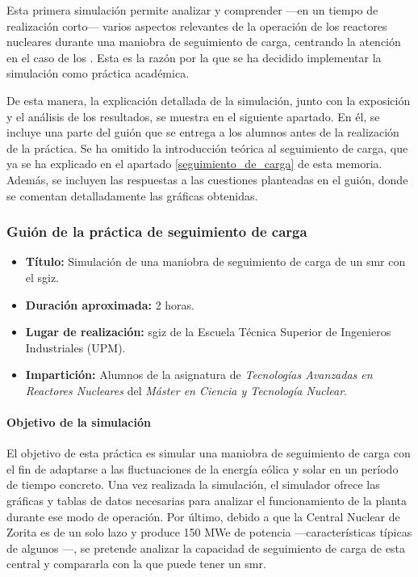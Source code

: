 Esta primera simulación permite analizar y comprender ---en un tiempo de realización corto--- varios aspectos relevantes de la operación de los reactores nucleares durante una maniobra de seguimiento de carga, centrando la atención en el caso de los . Esta es la razón por la que se ha decidido implementar la simulación como práctica académica.

De esta manera, la explicación detallada de la simulación, junto con la exposición y el análisis de los resultados, se muestra en el siguiente apartado. En él, se incluye una parte del guión que se entrega a los alumnos antes de la realización de la práctica. Se ha omitido la introducción teórica al seguimiento de carga, que ya se ha explicado en el apartado \ref{seguimiento_de_carga} de esta memoria. Además, se incluyen las respuestas a las cuestiones planteadas en el guión, donde se comentan detalladamente las gráficas obtenidas.

\subsubsection{Guión de la práctica de seguimiento de carga} \label{sec:anexo1}

\begin{itemize}
    \item \textbf{Título:} Simulación de una maniobra de seguimiento de carga de un \acrshort{smr} con el \acrshort{sgiz}.
    \item \textbf{Duración aproximada:} 2 horas.
    \item \textbf{Lugar de realización:} \acrfull{sgiz} de la Escuela Técnica Superior de Ingenieros Industriales (UPM).
    \item \textbf{Impartición:} Alumnos de la asignatura de \textit{Tecnologías Avanzadas en Reactores Nucleares} del \textit{Máster en Ciencia y Tecnología Nuclear}.
\end{itemize}

\paragraph{Objetivo de la simulación}

El objetivo de esta práctica es simular una maniobra de seguimiento de carga con el fin de adaptarse a las fluctuaciones de la energía eólica y solar en un período de tiempo concreto. Una vez realizada la simulación, el simulador ofrece las gráficas y tablas de datos necesarias para analizar el funcionamiento de la planta durante ese modo de operación. Por último, debido a que la Central Nuclear de Zorita es de un solo lazo y produce 150 MWe de potencia ---características típicas de algunos ---, se pretende analizar la capacidad de seguimiento de carga de esta central y compararla con la que puede tener un \acrshort{smr}.

